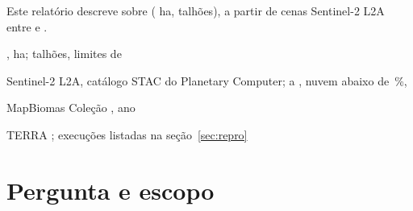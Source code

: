 \documentclass[11pt,a4paper]{article}
\begin{document}
\terraabertura


Este relatório descreve  sobre
 ( ha,  talhões), a partir
de  cenas Sentinel-2 L2A entre  e
.

\begin{sintese}
  \item {}
  \item {}
  \item {}
\end{sintese}

\begin{ficha}
  \item[Área] ,  ha;
         talhões, limites de 
  \item[Imagens] Sentinel-2 L2A, catálogo STAC do Planetary Computer;
         a , nuvem abaixo de
        \,\%, 
  \item[Referência] MapBiomas Coleção , ano 
  \item[Produtos] 
  \item[Software] TERRA ; execuções listadas na
        seção~\ref{sec:repro}
\end{ficha}

\newpage

\section{Pergunta e escopo}
\end{document}
